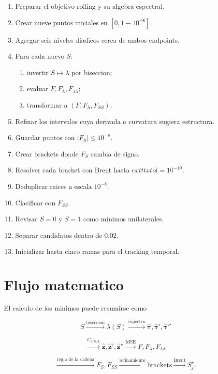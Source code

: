 \documentclass[11pt]{article}
\begin{document}
\begin{enumerate}[leftmargin=2.4em]
    \item Preparar el objetivo rolling y su algebra espectral.
    \item Crear nueve puntos iniciales en \([0,1-10^{-6}]\).
    \item Agregar seis niveles diadicos cerca de ambos endpoints.
    \item Para cada nuevo \(S\):
    \begin{enumerate}
        \item invertir \(S\mapsto\lambda\) por biseccion;
        \item evaluar \(F,F_\lambda,F_{\lambda\lambda}\);
        \item transformar a \((F,F_S,F_{SS})\).
    \end{enumerate}
    \item Refinar los intervalos cuya derivada o curvatura sugiera estructura.
    \item Guardar puntos con \(|F_S|\le10^{-8}\).
    \item Crear brackets donde \(F_S\) cambia de signo.
    \item Resolver cada bracket con Brent hasta
    \(	exttt{xtol}=10^{-10}\).
    \item Deduplicar raices a escala \(10^{-8}\).
    \item Clasificar con \(F_{SS}\).
    \item Revisar \(S=0\) y \(S=1\) como minimos unilaterales.
    \item Separar candidatos dentro de \(0.02\).
    \item Inicializar hasta cinco ramas para el tracking temporal.
\end{enumerate}

\section{Flujo matematico}

El calculo de los minimos puede resumirse como

\[
\boxed{
S
\xrightarrow{\text{biseccion}}
\lambda(S)
\xrightarrow{\text{espectro}}
\widehat{\bm\tau},
\widehat{\bm\tau}',
\widehat{\bm\tau}''
}
\]

\[
\boxed{
\xrightarrow{C_{d,h,L}}
\widehat{\bm z},
\widehat{\bm z}',
\widehat{\bm z}''
\xrightarrow{\text{MSE}}
F,
F_\lambda,
F_{\lambda\lambda}
}
\]

\[
\boxed{
\xrightarrow{\text{regla de la cadena}}
F_S,
F_{SS}
\xrightarrow{\text{refinamiento}}
\text{brackets}
\xrightarrow{\text{Brent}}
S_j^\star
}.
\]
\end{document}
